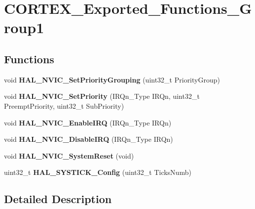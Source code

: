 \hypertarget{group___c_o_r_t_e_x___exported___functions___group1}{}\section{C\+O\+R\+T\+E\+X\+\_\+\+Exported\+\_\+\+Functions\+\_\+\+Group1}
\label{group___c_o_r_t_e_x___exported___functions___group1}
\subsection*{Functions}
\begin{DoxyCompactItemize}
\item 
\mbox{\label{group___c_o_r_t_e_x___exported___functions___group1_gad9be53e08b1498adea006e5e037f238f}} 
void {\bfseries H\+A\+L\+\_\+\+N\+V\+I\+C\+\_\+\+Set\+Priority\+Grouping} (uint32\+\_\+t Priority\+Group)
\item 
\mbox{\label{group___c_o_r_t_e_x___exported___functions___group1_ga8581a82025a4780efd00876a66e3e91b}} 
void {\bfseries H\+A\+L\+\_\+\+N\+V\+I\+C\+\_\+\+Set\+Priority} (I\+R\+Qn\+\_\+\+Type I\+R\+Qn, uint32\+\_\+t Preempt\+Priority, uint32\+\_\+t Sub\+Priority)
\item 
\mbox{\label{group___c_o_r_t_e_x___exported___functions___group1_gaaad4492c1b25e006d69948a15790352a}} 
void {\bfseries H\+A\+L\+\_\+\+N\+V\+I\+C\+\_\+\+Enable\+I\+RQ} (I\+R\+Qn\+\_\+\+Type I\+R\+Qn)
\item 
\mbox{\label{group___c_o_r_t_e_x___exported___functions___group1_ga50ca6290e068821cb84aa168f3e13967}} 
void {\bfseries H\+A\+L\+\_\+\+N\+V\+I\+C\+\_\+\+Disable\+I\+RQ} (I\+R\+Qn\+\_\+\+Type I\+R\+Qn)
\item 
\mbox{\label{group___c_o_r_t_e_x___exported___functions___group1_gac83d89028fabdf5d4c38ecf4fbfbefdc}} 
void {\bfseries H\+A\+L\+\_\+\+N\+V\+I\+C\+\_\+\+System\+Reset} (void)
\item 
\mbox{\label{group___c_o_r_t_e_x___exported___functions___group1_gac3a3f0d53c315523a8e6e7bcac1940cf}} 
uint32\+\_\+t {\bfseries H\+A\+L\+\_\+\+S\+Y\+S\+T\+I\+C\+K\+\_\+\+Config} (uint32\+\_\+t Ticks\+Numb)
\end{DoxyCompactItemize}


\subsection{Detailed Description}
